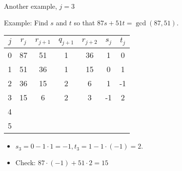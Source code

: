\documentclass[handout]{beamer}
\begin{document}
\begin{frame}{Another example, $j=3$}

Example: Find $s$ and $t$ so that $87s+51t = \gcd(87, 51)$.

\vspace{1em}

\begin{tabular}{|c|c|c|c|c|c|c|}\hline
$j$   &  $r_{j}$    & $r_{j+1}$ & $q_{j+1}$ & $r_{j+2}$ & $s_j$ & $t_j$ \\ \hline\hline
0     &  87         &  51       &    1      &   36      &  1    &   0   \\ \hline
1     &  51         &  36       &    1      &   15      &  0    &   1   \\ \hline
2     &  36         &  15       &    2      &    6      &  1    &  -1   \\ \hline
3     &  15         &   6       &    2      &    3      & -1    &   2   \\ \hline
4     &             &           &           &           &       &       \\ \hline
5     &             &           &           &           &       &       \\ \hline
\end{tabular}

\vspace{1em}

\begin{itemize}
  \item $s_3 = 0 - 1\cdot 1 = -1, t_3 = 1 - 1\cdot (-1) = 2$.
  \item Check: $87\cdot (-1) + 51\cdot 2 = 15$
\end{itemize}

\end{frame}
\end{document}
